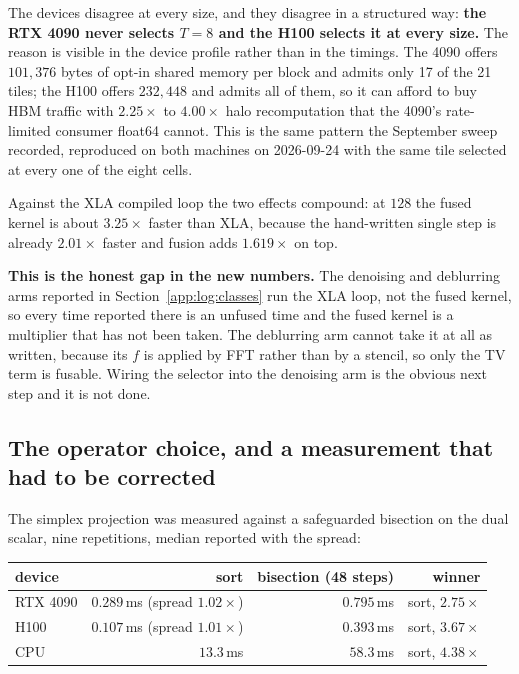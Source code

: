 \documentclass[11pt]{article}
\begin{document}
The devices disagree at every size, and they disagree in a structured way:
\textbf{the RTX 4090 never selects $T = 8$ and the H100 selects it at every
size.} The reason is visible in the device profile rather than in the
timings. The 4090 offers $101{,}376$ bytes of opt-in shared memory per block
and admits only 17 of the 21 tiles; the H100 offers $232{,}448$ and admits all
of them, so it can afford to buy HBM traffic with $2.25\times$ to $4.00\times$
halo recomputation that the 4090's rate-limited consumer float64 cannot. This
is the same pattern the September sweep recorded, reproduced on both machines
on 2026-09-24 with the same tile selected at every one of the eight cells.

Against the XLA compiled loop the two effects compound: at $128$ the fused
kernel is about $3.25\times$ faster than XLA, because the hand-written single
step is already $2.01\times$ faster and fusion adds $1.619\times$ on top.

\textbf{This is the honest gap in the new numbers.} The denoising and
deblurring arms reported in Section~\ref{app:log:classes} run the XLA loop,
not the fused kernel, so every time reported there is an unfused time and the
fused kernel is a multiplier that has not been taken. The deblurring arm
cannot take it at all as written, because its $f$ is applied by FFT rather
than by a stencil, so only the TV term is fusable. Wiring the selector into
the denoising arm is the obvious next step and it is not done.

\subsection{The operator choice, and a measurement that had to be corrected}

The simplex projection was measured against a safeguarded bisection on the
dual scalar, nine repetitions, median reported with the spread:

\begin{center}\small
\begin{tabular}{@{}lrrr@{}}
\toprule
device & sort & bisection (48 steps) & winner \\
\midrule
RTX 4090 & $0.289$\,ms (spread $1.02\times$) & $0.795$\,ms & sort, $2.75\times$ \\
H100     & $0.107$\,ms (spread $1.01\times$) & $0.393$\,ms & sort, $3.67\times$ \\
CPU      & $13.3$\,ms & $58.3$\,ms & sort, $4.38\times$ \\
\bottomrule
\end{tabular}
\end{center}
\end{document}
